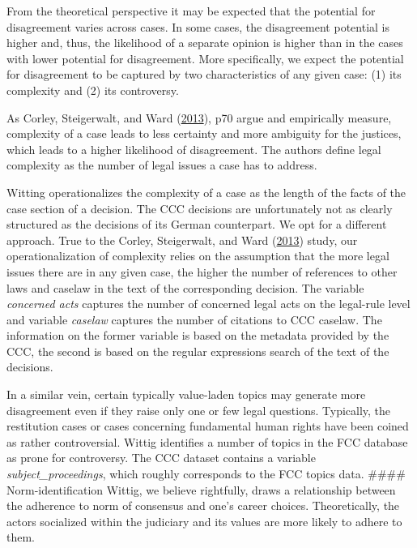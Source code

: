 \documentclass[
  11pt,
]{article}
\begin{document}
From the theoretical perspective it may be expected that the potential
for disagreement varies across cases. In some cases, the disagreement
potential is higher and, thus, the likelihood of a separate opinion is
higher than in the cases with lower potential for disagreement. More
specifically, we expect the potential for disagreement to be captured by
two characteristics of any given case: (1) its complexity and (2) its
controversy.

As Corley, Steigerwalt, and Ward
(\protect\hyperlink{ref-corleyPuzzleUnanimityConsensus2013}{2013}), p70
argue and empirically measure, complexity of a case leads to less
certainty and more ambiguity for the justices, which leads to a higher
likelihood of disagreement. The authors define legal complexity as the
number of legal issues a case has to address.

Witting operationalizes the complexity of a case as the length of the
facts of the case section of a decision. The CCC decisions are
unfortunately not as clearly structured as the decisions of its German
counterpart. We opt for a different approach. True to the Corley,
Steigerwalt, and Ward
(\protect\hyperlink{ref-corleyPuzzleUnanimityConsensus2013}{2013})
study, our operationalization of complexity relies on the assumption
that the more legal issues there are in any given case, the higher the
number of references to other laws and caselaw in the text of the
corresponding decision. The variable \emph{concerned acts} captures the
number of concerned legal acts on the legal-rule level and variable
\emph{caselaw} captures the number of citations to CCC caselaw. The
information on the former variable is based on the metadata provided by
the CCC, the second is based on the regular expressions search of the
text of the decisions.

In a similar vein, certain typically value-laden topics may generate
more disagreement even if they raise only one or few legal questions.
Typically, the restitution cases or cases concerning fundamental human
rights have been coined as rather controversial. Wittig identifies a
number of topics in the FCC database as prone for controversy. The CCC
dataset contains a variable \emph{subject\_proceedings}, which roughly
corresponds to the FCC topics data. \#\#\#\# Norm-identification Wittig,
we believe rightfully, draws a relationship between the adherence to
norm of consensus and one's career choices. Theoretically, the actors
socialized within the judiciary and its values are more likely to adhere
to them.
\end{document}
